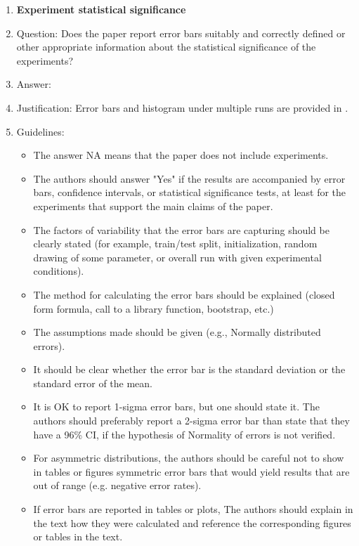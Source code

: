 \documentclass{article}
\begin{document}
{\begin{enumerate}
\item {\bf Experiment statistical significance}
    \item[] Question: Does the paper report error bars suitably and correctly defined or other appropriate information about the statistical significance of the experiments?
    \item[] Answer: \answerYes{} %
    \item[] Justification: Error bars and histogram under multiple runs are provided in .
    \item[] Guidelines:
    \begin{itemize}
        \item The answer NA means that the paper does not include experiments.
        \item The authors should answer "Yes" if the results are accompanied by error bars, confidence intervals, or statistical significance tests, at least for the experiments that support the main claims of the paper.
        \item The factors of variability that the error bars are capturing should be clearly stated (for example, train/test split, initialization, random drawing of some parameter, or overall run with given experimental conditions).
        \item The method for calculating the error bars should be explained (closed form formula, call to a library function, bootstrap, etc.)
        \item The assumptions made should be given (e.g., Normally distributed errors).
        \item It should be clear whether the error bar is the standard deviation or the standard error of the mean.
        \item It is OK to report 1-sigma error bars, but one should state it. The authors should preferably report a 2-sigma error bar than state that they have a 96\% CI, if the hypothesis of Normality of errors is not verified.
        \item For asymmetric distributions, the authors should be careful not to show in tables or figures symmetric error bars that would yield results that are out of range (e.g. negative error rates).
        \item If error bars are reported in tables or plots, The authors should explain in the text how they were calculated and reference the corresponding figures or tables in the text.
    \end{itemize}


\end{enumerate}}
\end{document}
